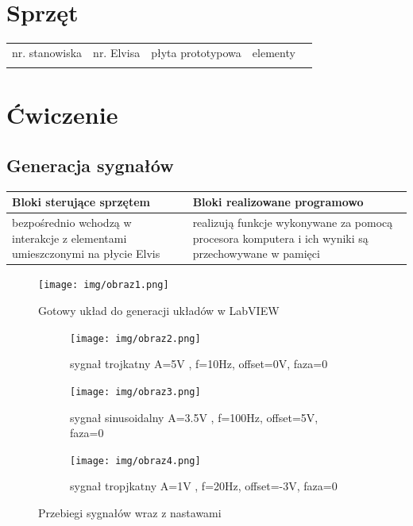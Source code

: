 \documentclass[11pt]{article}
\begin{document}
\section{Sprzęt}
\begin{table}[H]
\centering
\begin{tabular}{lllll}
\cline{1-4}
\multicolumn{1}{|l|}{nr. stanowiska} & \multicolumn{1}{l|}{nr. Elvisa} & \multicolumn{1}{l|}{płyta prototypowa} & \multicolumn{1}{l|}{elementy} &  \\ \cline{1-4}
\multicolumn{1}{|l|}{}               & \multicolumn{1}{l|}{}           & \multicolumn{1}{l|}{}                  & \multicolumn{1}{l|}{}         &  \\ \cline{1-4}
\end{tabular}
\end{table}

\section{Ćwiczenie}
\subsection{Generacja sygnałów}

\begin{table}[H]
\centering
\begin{tabular}{|p{5cm}|p{5cm}|}
\hline
Bloki sterujące sprzętem & Bloki realizowane programowo \\ \hline
bezpośrednio wchodzą w interakcje z elementami umieszczonymi na płycie Elvis &  realizują funkcje wykonywane za pomocą procesora komputera i ich wyniki są przechowywane w pamięci \\ \hline
\end{tabular}
\end{table}


\begin{figure}[H]
    \centering
    \texttt{[image: img/obraz1.png]}
    \caption{Gotowy układ do generacji układów w LabVIEW}
    \label{fig:placeholder}
\end{figure}

\begin{figure}[H]
  \centering
  \begin{subfigure}{.48\textwidth}
    \centering
    \texttt{[image: img/obraz2.png]}
    \caption{sygnał trojkatny A=5V , f=10Hz, offset=0V, faza=0\degree}
    \label{fig:sub1}
  \end{subfigure}\hfill
  \begin{subfigure}{.48\textwidth}
    \centering
    \texttt{[image: img/obraz3.png]}
    \caption{sygnał sinusoidalny A=3.5V , f=100Hz, offset=5V, faza=0\degree}
    \label{fig:sub2}
  \end{subfigure}
  \begin{subfigure}{.48\textwidth}
    \centering
    \texttt{[image: img/obraz4.png]}
    \caption{sygnał tropjkatny A=1V , f=20Hz, offset=-3V, faza=0\degree}
    \label{fig:sub3}
  \end{subfigure}

  \caption{Przebiegi sygnałów wraz z nastawami}
  \label{fig:przebiegi}
\end{figure}
\end{document}

